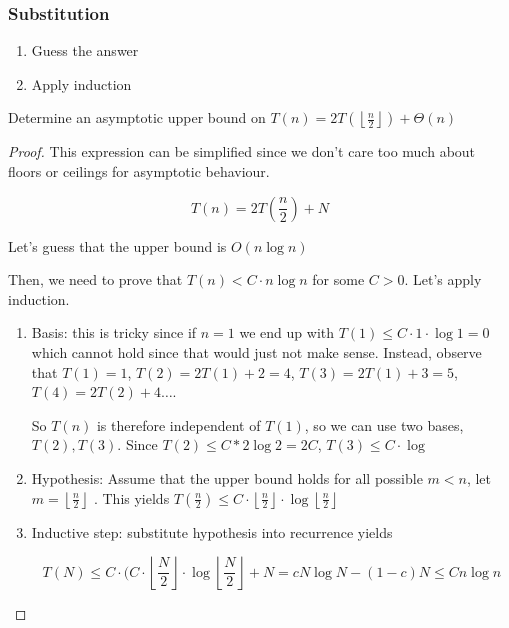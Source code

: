 \documentclass[../notes.tex]{subfiles}
\begin{document}
\subsubsection{Substitution}

\begin{enumerate}
	\item Guess the answer
	\item Apply induction
\end{enumerate}


\begin{example}
	Determine an asymptotic upper bound on $ T(n) = 2T(\left\lfloor \frac{n}{2} \right\rfloor ) + \Theta(n)$ 
	\begin{proof}

		This expression can be simplified since we don't care too much about floors or ceilings for asymptotic behaviour.

		\begin{equation}
			T(n) = 2T(\frac{n}{2}) + N
		\end{equation}

		Let's guess that the upper bound is $ O(n\log n) $ 

		Then, we need to prove that $ T(n) < C \cdot n \log n$  for some $ C > 0 $. Let's apply induction.

		\begin{enumerate}
			\item Basis: this is tricky since if $ n =1  $ we end up with $ T(1) \le  C \cdot 1 \cdot \log 1 = 0$ which cannot hold since that would just not make sense. Instead, observe that $ T(1) = 1 $, $ T(2) = 2T(1) + 2 = 4 $, $ T(3) = 2T(1) + 3 = 5  $, $ T(4) = 2T(2) + 4  \ldots$.

				So $ T(n) $ is therefore independent of $ T(1) $, so we can use two bases, $ T(2),T(3)$. Since $ T(2) \le  C * 2 \log 2 = 2C$, $ T(3) \le C \cdot \log  $ 
			\item Hypothesis: Assume that the upper bound holds for all possible $ m < n$, let $ m = \left\lfloor \frac{n}{2} \right\rfloor$ . This yields $ T(\frac{n}{2}) \le C \cdot  \left\lfloor \frac{n}{2} \right\rfloor \cdot  \log \left\lfloor \frac{n}{2} \right\rfloor $ 
			\item Inductive step: substitute hypothesis into recurrence yields 

				\begin{equation}
				 T(N) \le C \cdot ( C \cdot \left\lfloor  \frac{N}{2} \right\rfloor \cdot  \log \left\lfloor \frac{N}{2} \right\rfloor + N  = c N\log N - (1-c)N \le Cn\log n
				\end{equation}
		\end{enumerate}
		

\end{proof}
\end{example}
\end{document}
